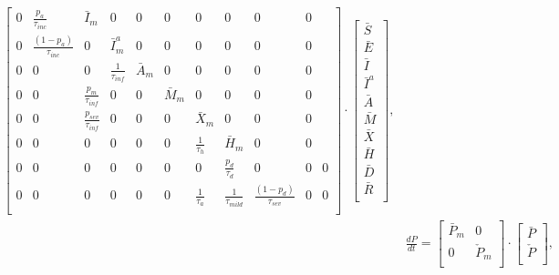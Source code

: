 \documentclass[notitlepage, superscriptaddress]{revtex4-2}
\begin{document}
\begin{eqnarray}
\begin{bmatrix}
0 & \frac{p_{a}}{\tau_{inc}} & \bar{I}_{m} & 0 & 0 & 0 & 0 & 0 & 0 & 0 \\[.15cm] 
0 & \frac{(1-p_{a})}{\tau_{inc}} & 0  & \bar{I}^{a}_{m}  & 0 & 0 & 0 & 0 & 0 & 0 \\[.15cm] 
0 & 0 & 0 & \frac{1}{\tau_{inf}}  & \bar{A}_{m} & 0 & 0 & 0 & 0 & 0 \\[.15cm] 
0 & 0 & \frac{p_{m}}{\tau_{inf}} & 0 & 0  & \bar{M}_{m}  & 0 & 0 & 0 & 0 \\[.15cm] 
0 & 0 & \frac{p_{sev}}{\tau_{inf}} & 0 & 0 & 0  & \bar{X}_{m}  & 0 & 0 & 0 \\[.15cm] 
0 & 0 & 0 & 0 & 0 & 0 & \frac{1}{\tau_{h}}  & \bar{H}_{m}  & 0 & 0 \\[.15cm] 
0 & 0 & 0 & 0 & 0 & 0 & 0 & \frac{p_{d}}{\tau_{d}}  & 0 & 0 & 0 \\[.15cm]
0 & 0 & 0 & 0 & 0 & 0 & \frac{1}{\tau_{a}} & \frac{1}{\tau_{mild}}  & \frac{(1-p_{d})}{\tau_{sev}} & 0 & 0  \\[.15cm]
\end{bmatrix}
\cdot
\begin{bmatrix}
\bar{S} \\[.15cm]
\bar{E} \\[.15cm]
\bar{I} \\[.15cm]
\bar{I}^{a} \\[.15cm]
\bar{A} \\[.15cm]
\bar{M} \\[.15cm]
\bar{X} \\[.15cm]
\bar{H} \\[.15cm]
\bar{D} \\[.15cm]
\bar{R} \\[.15cm]
\end{bmatrix}, \\ 
%
&\frac{dP}{dt} =
\begin{bmatrix}
\bar{P}_m & 0\\[.15cm]
0 & \check{P}_{m} \\[.15cm]
\end{bmatrix}
\cdot
\begin{bmatrix}
\bar{P} \\[.15cm]
\check{P} \\[.15cm]
\end{bmatrix},
\end{eqnarray}
\end{document}
